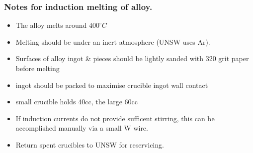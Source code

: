 \subsubsection{Notes for induction melting of \MgZnCa alloy.}
\begin{itemize}
\item The \MgZnCa alloy melts around $400^{\circ}C$
\item Melting should be under an inert atmosphere (UNSW uses Ar).
\item Surfaces of alloy ingot & pieces should be lightly sanded with 320 grit paper before melting
\item ingot should be packed to maximise crucible ingot wall contact
\item small crucible holds 40cc, the large 60cc
\item If induction currents do not provide sufficent stirring, this can be accomplished manually via a small W wire. 
\item Return spent crucibles to UNSW for reservicing. 
\end{itemize}